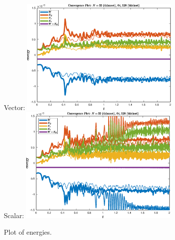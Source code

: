 \documentclass{article}
\begin{document}
\newpage

\begin{figure}[ht]
Vector:
\includegraphics[width=0.7\textwidth]{energies2.eps}  \\
Scalar:
\includegraphics[width=0.7\textwidth]{energies2_scalar.eps} 
\caption{Plot of energies.}
\end{figure}
\end{document}
